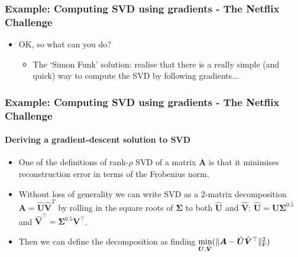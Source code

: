 \documentclass[\beamerclass]{beamer}
\begin{document}
\begin{frame}
\frametitle{Example: Computing SVD using gradients - The Netflix Challenge}
\begin{itemize}
	\item<+-> OK, so what can you do?
	\begin{itemize}
		\item<+-> The `Simon Funk' solution: realise that there is a really simple (and quick) way to compute the SVD by following gradients...
	\end{itemize}
\end{itemize}
\end{frame}

\begin{frame}
\frametitle{Example: Computing SVD using gradients - The Netflix Challenge}
\framesubtitle{Deriving a gradient-descent solution to SVD}
\begin{itemize}
	\item<+-> One of the definitions of rank-$\rho$ SVD of a matrix $\bm A$ is that it minimises reconstruction error in terms of the Frobenius norm.
	\item<+-> Without loss of generality we can write SVD as a 2-matrix decomposition $\bm A = \hat{\bm U} \hat{\bm V}^T$ by rolling in the square roots of $\bm\Sigma$ to both $\hat{\bm U}$ and $\hat{\bm V}$: $\hat{\bm U} = \bm U \bm\Sigma^{0.5}$ and $\hat{\bm V}^\top = \bm \Sigma^{0.5} \bm V^\top$.
	\item<+-> Then we can define the decomposition as finding $\min\limits_{\hat{\bm U}, \hat{\bm V}}( \| \bm A - \hat{\bm U}\hat{\bm V}^\top \|_{\rm F}^2 )$
\end{itemize}
\end{frame}
\end{document}
